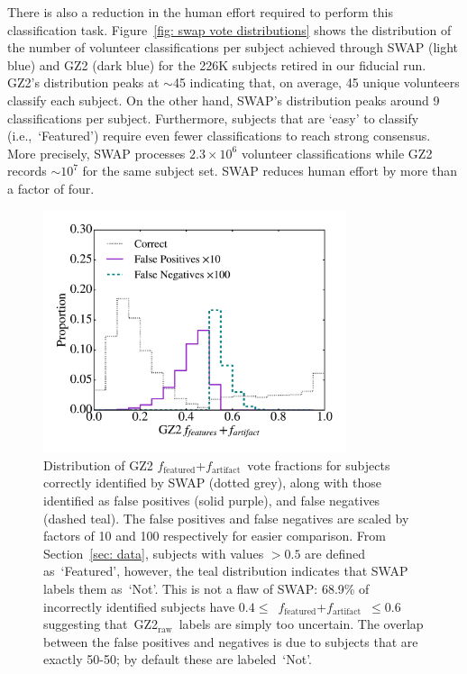 \documentclass[twocolumn]{aastex6}
\newcommand{\feat}{`Featured'}
\newcommand{\notfeat}{`Not'}
\newcommand{\raw}{GZ2$_{\text{raw}}$}
\newcommand{\ffeat}{$f_{\mathrm{featured}}$}
\newcommand{\fstar}{$f_{\mathrm{artifact}}$}
\begin{document}
There is also a reduction in the human effort required to perform this classification task.
  Figure~\ref{fig: swap vote distributions} shows the distribution of the number 
of volunteer classifications per subject achieved through SWAP (light blue) 
and GZ2 (dark blue) for the 226K subjects retired in our fiducial run. 
GZ2's distribution peaks at $\sim$45 indicating that, on average,
45 unique volunteers classify each subject. On the other hand, SWAP's
distribution peaks around 9 classifications per subject. 
Furthermore, subjects that are `easy' to classify (i.e.,~\feat) require
even fewer classifications to reach strong consensus. 
More precisely, SWAP processes $2.3 \times 10^6$ volunteer 
classifications while GZ2 records $\sim$$10^7$ for the same subject set. 
SWAP reduces human effort by more than a factor of four. 



\begin{figure}[t!]
\includegraphics[width=3.5in]{f5.pdf}
\caption{Distribution of GZ2 \ffeat+\fstar~vote fractions for subjects correctly identified by SWAP (dotted grey), along with those identified as false positives (solid purple), and false negatives (dashed teal). 
The false positives and false negatives are scaled by factors of 10 and 100 respectively for easier comparison. From Section~\ref{sec: data}, subjects with values $> 0.5$ are defined as~\feat, however, the teal distribution indicates that SWAP labels them as~\notfeat. This is not a flaw of SWAP: 68.9\% of incorrectly identified subjects have $0.4 \le $~\ffeat +\fstar~$ \le 0.6$ suggesting that~\raw~labels are simply too uncertain. The overlap between the false positives and negatives is due to subjects that are exactly 50-50; by default these are labeled~\notfeat. \label{fig: SWAP sucks}}
\end{figure}
\end{document}
